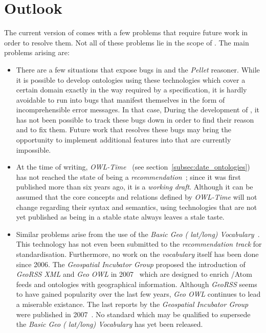\vspace{1em}


\section{Outlook}

The current version of \smarthomeweather comes with a few problems that require future work in order to resolve them. Not all of these problems lie in the scope of \smarthomeweather. The main problems arising are:

\begin{itemize}
  \item There are a few situations that expose bugs in \protege and the \emph{Pellet} reasoner. While it is possible to develop ontologies using these technologies which cover a certain domain exactly in the way required by a specification, it is hardly avoidable to run into bugs that manifest themselves in the form of incomprehensible error messages. In that case, During the development of \smarthomeweather, it has not been possible to track these bugs down in order to find their reason and to fix them. Future work that resolves these bugs may bring the opportunity to implement additional features into \smarthomeweather that are currently impossible.
  
  \item At the time of writing, \emph{OWL-Time}~\cite{owl-time} (see section~\ref{subsec:date_ontologies}) has not reached the state of being a \emph{ recommendation}~\cite{w3c-process}; since it was first published more than six years ago, it is a \emph{working draft}. Although it can be assumed that the core concepts and relations defined by \emph{OWL-Time} will not change regarding their syntax and semantics, using technologies that are not yet published as being in a stable state always leaves a stale taste.
  
  \item Similar problems arise from the use of the \emph{Basic Geo ( lat/long) Vocabulary}~\cite{wgs84_vocabulary}. This technology has not even been submitted to the \emph{ recommendation track} for standardisation. Furthermore, no work on the \emph{ vocabulary} itself has been done since 2006. The \emph{ Geospatial Incubator Group} proposed the introduction of \emph{GeoRSS XML} and \emph{Geo OWL} in 2007~\cite{w3c_geo_report1} which are designed to enrich /Atom feeds and  ontologies with geographical information. Although \emph{GeoRSS} seems to have gained popularity over the last few years, \emph{Geo OWL} continues to lead a miserable existance. The last reports by the \emph{ Geospatial Incubator Group} were published in 2007~\cite{w3c_geo_report1,w3c_geo_report2}. No standard which may be qualified to supersede the \emph{Basic Geo ( lat/long) Vocabulary} has yet been released.
\end{itemize}

